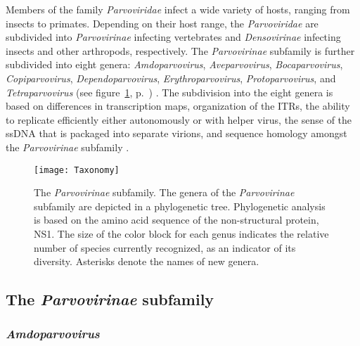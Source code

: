Members of the family \textit{Parvoviridae} infect a wide variety of hosts, ranging from insects to primates.
Depending on their host range, the \textit{Parvoviridae} are subdivided into \textit{Parvovirinae} infecting vertebrates and \textit{Densovirinae} infecting insects and other arthropods, respectively. The \textit{Parvovirinae} subfamily is further subdivided into eight genera: \textit{Amdoparvovirus}, \textit{Aveparvovirus}, \textit{Bocaparvovirus}, \textit{Copiparvovirus}, \textit{Dependoparvovirus}, \textit{Erythroparvovirus}, \textit{Protoparvovirus}, and \textit{Tetraparvovirus} (see figure~\ref{Fig: Taxonomy}, p.~\pageref{Fig: Taxonomy}) \cite{pmid24212889}. The subdivision into the eight genera is based on differences in transcription maps, organization of the ITRs, the ability to replicate efficiently either autonomously or with helper virus, the sense of the ssDNA that is packaged into separate virions, and sequence homology amongst the \textit{Parvovirinae} subfamily \cite{pmid11222696, icvt}.


\begin{figure}[h]
\centering
\texttt{[image: Taxonomy]}
\caption[The \textit{Parvovirinae} subfamily]{The \textit{Parvovirinae} subfamily. The genera of the \textit{Parvovirinae} subfamily are depicted in a phylogenetic tree. Phylogenetic analysis is based on the amino acid sequence of the non-structural protein, NS1. The size of the color block for each genus indicates the relative number of species currently recognized, as an indicator of its diversity. Asterisks denote the names of new genera.} 
\label{Fig: Taxonomy}
\end{figure}



\subsection{The \textit{Parvovirinae} subfamily}
\label{sec: The Parvovirinae subfamily}   


\subsubsection{\textit{Amdoparvovirus}}

